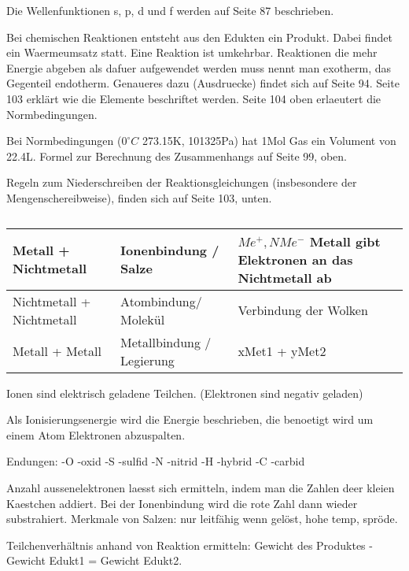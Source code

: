 \documentclass[11pt,paper=a4,final]{scrartcl}
\begin{document}
Die Wellenfunktionen s, p, d und f werden auf Seite 87 beschrieben.

Bei chemischen Reaktionen entsteht aus den Edukten ein Produkt. Dabei findet ein
Waermeumsatz statt. Eine Reaktion ist umkehrbar. Reaktionen die mehr Energie
abgeben als dafuer aufgewendet werden muss nennt man exotherm, das Gegenteil
endotherm. Genaueres dazu (Ausdruecke) findet sich auf Seite 94. Seite 103
erkl\"art wie die Elemente beschriftet werden. Seite 104 oben erlaeutert die
Normbedingungen.

Bei Normbedingungen (\(0^{\circ}C\) 273.15K, 101325Pa) hat 1Mol Gas ein Volument
von 22.4L. Formel zur Berechnung des Zusammenhangs auf Seite 99, oben.

Regeln zum Niederschreiben der Reaktionsgleichungen (insbesondere der
Mengenschereibweise), finden sich auf Seite 103, unten.
\begin{table}[h!]
  \centering
  \begin{tabular}{|l|l|p{6cm}|}\hline
    Metall + Nichtmetall & Ionenbindung / Salze & \(Me^+, NMe^- \) Metall gibt
    Elektronen an das Nichtmetall ab\\ \hline
    Nichtmetall + Nichtmetall & Atombindung/ Molek\"ul & Verbindung der Wolken
    \\ \hline
    Metall + Metall & Metallbindung / Legierung & xMet1 + yMet2 \\ \hline
  \end{tabular}
  \caption{}
  \label{tab:}
\end{table}
Ionen sind elektrisch geladene Teilchen. (Elektronen sind negativ geladen)

Als Ionisierungsenergie wird die Energie beschrieben, die benoetigt wird um
einem Atom Elektronen abzuspalten.

Endungen: -O -oxid -S -sulfid -N -nitrid -H -hybrid -C -carbid

Anzahl aussenelektronen laesst sich ermitteln, indem man die Zahlen deer kleien
Kaestchen addiert. Bei der Ionenbindung wird die rote Zahl dann wieder
substrahiert.
Merkmale von Salzen: nur leitf\"ahig wenn gel\"ost, hohe temp, spr\"ode.

Teilchenverh\"altnis anhand von Reaktion ermitteln: Gewicht des Produktes -
Gewicht Edukt1 = Gewicht Edukt2.
\end{document}
